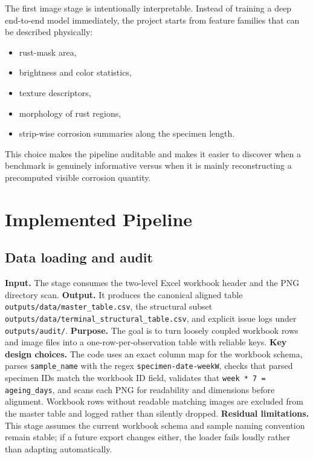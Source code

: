 \documentclass[10pt,a4paper,twocolumn]{article}
\begin{document}
The first image stage is intentionally interpretable. Instead of training a deep end-to-end model immediately, the project starts from feature families that can be described physically:

\begin{itemize}
    \item rust-mask area,
    \item brightness and color statistics,
    \item texture descriptors,
    \item morphology of rust regions,
    \item strip-wise corrosion summaries along the specimen length.
\end{itemize}

This choice makes the pipeline auditable and makes it easier to discover when a benchmark is genuinely informative versus when it is mainly reconstructing a precomputed visible corrosion quantity.

\section{Implemented Pipeline}

\subsection{Data loading and audit}

\textbf{Input.} The stage consumes the two-level Excel workbook header and the PNG directory scan. \textbf{Output.} It produces the canonical aligned table \texttt{outputs/data/master\_table.csv}, the structural subset \texttt{outputs/data/terminal\_structural\_table.csv}, and explicit issue logs under \texttt{outputs/audit/}. \textbf{Purpose.} The goal is to turn loosely coupled workbook rows and image files into a one-row-per-observation table with reliable keys. \textbf{Key design choices.} The code uses an exact column map for the workbook schema, parses \texttt{sample\_name} with the regex \texttt{specimen-date-weekW}, checks that parsed specimen IDs match the workbook ID field, validates that \texttt{week * 7 = ageing\_days}, and scans each PNG for readability and dimensions before alignment. Workbook rows without readable matching images are excluded from the master table and logged rather than silently dropped. \textbf{Residual limitations.} This stage assumes the current workbook schema and sample naming convention remain stable; if a future export changes either, the loader fails loudly rather than adapting automatically.
\end{document}
